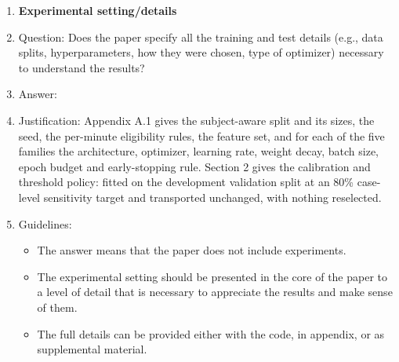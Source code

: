 \begin{enumerate}
\item {\bf Experimental setting/details}
    \item[] Question: Does the paper specify all the training and test details (e.g., data splits, hyperparameters, how they were chosen, type of optimizer) necessary to understand the results?
    \item[] Answer: \answerYes{}
    \item[] Justification: Appendix A.1 gives the subject-aware split and its sizes, the seed, the per-minute eligibility rules, the feature set, and for each of the five families the architecture, optimizer, learning rate, weight decay, batch size, epoch budget and early-stopping rule. Section 2 gives the calibration and threshold policy: fitted on the development validation split at an 80\% case-level sensitivity target and transported unchanged, with nothing reselected.
    \item[] Guidelines:
    \begin{itemize}
        \item The answer \answerNA{} means that the paper does not include experiments.
        \item The experimental setting should be presented in the core of the paper to a level of detail that is necessary to appreciate the results and make sense of them.
        \item The full details can be provided either with the code, in appendix, or as supplemental material.
    \end{itemize}


\end{enumerate}
